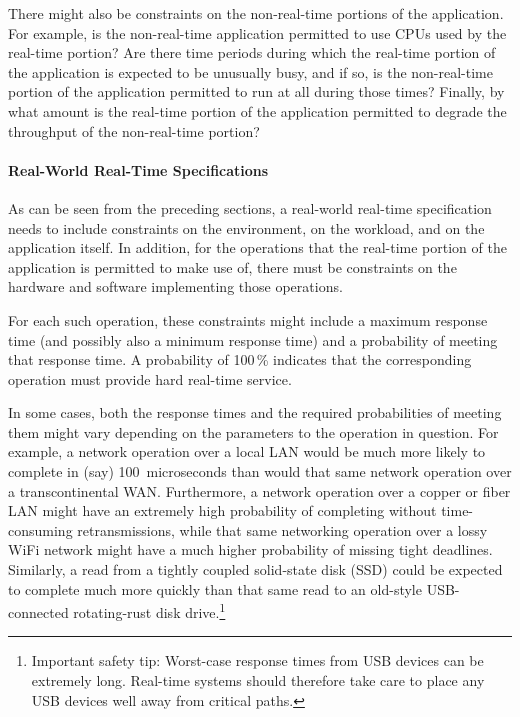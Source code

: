 There might also be constraints on the non-real-time portions of the
application.
For example, is the non-real-time application permitted to use CPUs used
by the real-time portion?
Are there time periods during which the real-time portion of the application
is expected to be unusually busy, and if so, is the non-real-time portion
of the application permitted to run at all during those times?
Finally, by what amount is the real-time portion of the application permitted
to degrade the throughput of the non-real-time portion?

\paragraph{Real-World Real-Time Specifications}
\label{sec:advsync:Real-World Real-Time Specifications}

As can be seen from the preceding sections, a real-world real-time
specification needs to include constraints on the environment,
on the workload, and on the application itself.
In addition, for the operations that the real-time portion of the
application is permitted to make use of, there must be constraints
on the hardware and software implementing those operations.

For each such operation, these constraints might include a maximum
response time (and possibly also a minimum response time) and a
probability of meeting that response time.
A probability of 100\,\% indicates that the corresponding operation
must provide hard real-time service.

In some cases, both the response times and the required probabilities of
meeting them might vary depending on the parameters to the operation in
question.
For example, a network operation over a local LAN would be much more likely
to complete in (say) 100~microseconds than would that same network operation
over a transcontinental WAN.
Furthermore, a network operation over a copper or fiber
LAN might have an extremely
high probability of completing without time-consuming retransmissions,
while that same networking operation over a lossy WiFi network might
have a much higher probability of missing tight deadlines.
Similarly, a read from a tightly coupled solid-state disk (SSD) could be
expected to complete much more quickly than that same read to an old-style
USB-connected rotating-rust disk drive.\footnote{
	Important safety tip:  Worst-case response times from USB devices
	can be extremely long.
	Real-time systems should therefore take care to place any USB
	devices well away from critical paths.}

